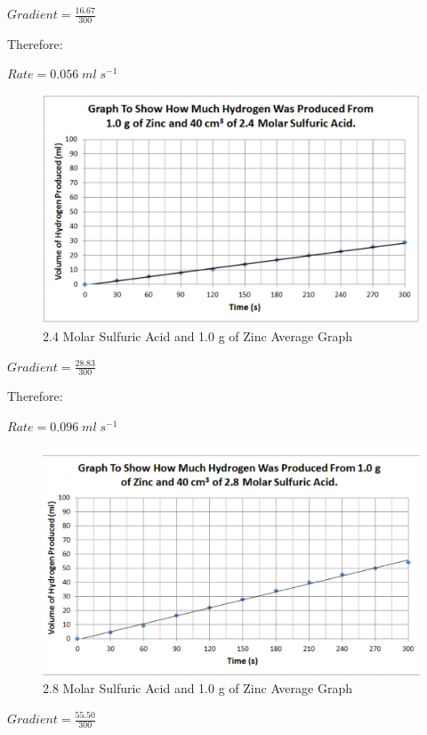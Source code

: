$Gradient = \frac{16.67}{300}$

Therefore:

$Rate = 0.056 \; ml \; s^{-1}$

\begin{figure}[H]
    \includegraphics[width=\textwidth]{./Analysis/Images/1NonCatalyst/24Molar.pdf}
    \caption{2.4 Molar Sulfuric Acid and 1.0 g of Zinc Average Graph} \label{fig:24MolarSAGradient}
\end{figure}

$Gradient = \frac{28.83}{300}$

Therefore:

$Rate = 0.096 \; ml \; s^{-1}$

\begin{figure}[H]
    \includegraphics[width=\textwidth]{./Analysis/Images/1NonCatalyst/28Molar.pdf}
    \caption{2.8 Molar Sulfuric Acid and 1.0 g of Zinc Average Graph} \label{fig:28MolarSAGradient}
\end{figure}

$Gradient = \frac{55.50}{300}$

